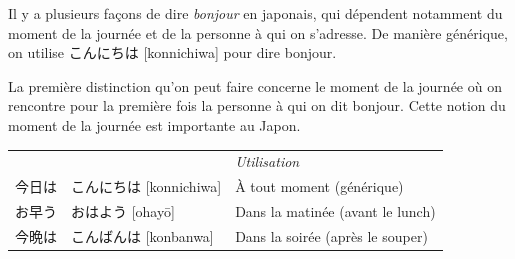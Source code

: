 \documentclass[a4paper,11pt,final]{article}
\newcommand{\sectit}[1]{\bigskip\hspace{-5mm}{\color{sectionblue}$\blacksquare$~~\Large\bfseries #1}}
\newcommand{\romaji}[1]{{\footnotesize[#1]}}
\begin{document}

\vspace{15mm}
	

Il y a plusieurs façons de dire \textit{bonjour} en japonais, qui dépendent notamment du moment de la journée et de la personne à qui on s'adresse. De manière générique, on utilise こんにちは \romaji{konnichiwa} pour dire bonjour.


\sectit{Au long de la journée}

La première distinction qu'on peut faire concerne le moment de la journée où on rencontre pour la première fois la personne à qui on dit bonjour. Cette notion du moment de la journée est importante au Japon.

\hspace{5mm}\begin{tabular}{|p{2cm}p{4.5cm}l}
	\multicolumn{1}{l}{}&& \it\small Utilisation \\
	今日は			& こんにちは \romaji{konnichiwa}		& À tout moment (générique) \\
	お早う			& おはよう \romaji{ohay\=o}			& Dans la matinée (avant le lunch) \\
	今晩は			& こんばんは \romaji{konbanwa}		& Dans la soirée (après le souper)
\end{tabular}
\end{document}
